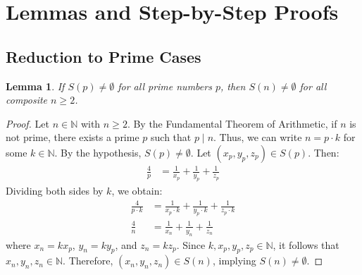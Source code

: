 \documentclass[12pt,a4paper]{article}
\newtheorem{lemma}[theorem]{Lemma}
\begin{document}
\section{Lemmas and Step-by-Step Proofs}

\subsection{Reduction to Prime Cases}
\begin{lemma} \label{lem:prime_reduction}
If $S(p) \neq \emptyset$ for all prime numbers $p$, then $S(n) \neq \emptyset$ for all composite $n \ge 2$.
\end{lemma}
\begin{proof}
Let $n \in \mathbb{N}$ with $n \ge 2$. By the Fundamental Theorem of Arithmetic, if $n$ is not prime, there exists a prime $p$ such that $p \mid n$. Thus, we can write $n = p \cdot k$ for some $k \in \mathbb{N}$.
By the hypothesis, $S(p) \neq \emptyset$. Let $(x_p, y_p, z_p) \in S(p)$. Then:
\begin{align}
\frac{4}{p} &= \frac{1}{x_p} + \frac{1}{y_p} + \frac{1}{z_p}
\end{align}
Dividing both sides by $k$, we obtain:
\begin{align}
\frac{4}{p \cdot k} &= \frac{1}{x_p \cdot k} + \frac{1}{y_p \cdot k} + \frac{1}{z_p \cdot k} \nonumber \\
\frac{4}{n} &= \frac{1}{x_n} + \frac{1}{y_n} + \frac{1}{z_n}
\end{align}
where $x_n = k x_p$, $y_n = k y_p$, and $z_n = k z_p$. Since $k, x_p, y_p, z_p \in \mathbb{N}$, it follows that $x_n, y_n, z_n \in \mathbb{N}$. Therefore, $(x_n, y_n, z_n) \in S(n)$, implying $S(n) \neq \emptyset$.
\end{proof}
\end{document}

